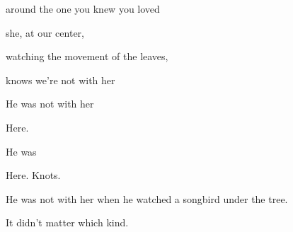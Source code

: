 \documentclass[11pt]{article}
\begin{document}
\begingroup
\begin{center}
around the one you knew you loved
\rightskip\leftskip
\end{center}
\endgroup

\begingroup
\begin{center}
she, at our center,
\rightskip\leftskip
\end{center}
\endgroup

\begingroup
\begin{center}
watching the movement of the leaves,
\rightskip\leftskip
\end{center}
\endgroup

\begingroup
\begin{center}
knows we're not with her
\rightskip\leftskip
\end{center}
\endgroup

\vspace*{2\baselineskip}

\begingroup
\begin{center}
He was not with her
\end{center}
\endgroup

\vspace*{4\baselineskip}

\begingroup
\begin{center}
Here.
\rightskip\leftskip
\end{center}
\endgroup

\vspace*{4\baselineskip}

\begingroup
\begin{center}
He was
\end{center}
\endgroup

\vspace*{4\baselineskip}

\begingroup
\begin{center}
Here. Knots.
\rightskip\leftskip
\end{center}
\endgroup

\vspace*{6\baselineskip}

\begingroup
\begin{center}
He was not with her when he watched a songbird under the tree.
\end{center}
\endgroup

\begingroup
\begin{center}
It didn't matter which kind.
\end{center}
\endgroup
\end{document}
